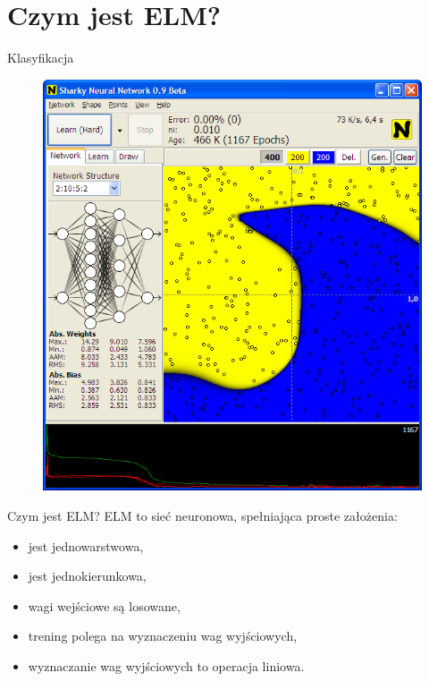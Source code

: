 \documentclass{beamer}
\begin{document}
\section{Czym jest ELM?}
\begin{frame}{Klasyfikacja}
\begin{figure}
	\includegraphics[scale=0.3]{klasyfikacja.png}
\end{figure}
\end{frame}
\begin{frame}{Czym jest ELM?}
ELM to sieć neuronowa, spełniająca proste założenia:
\begin{itemize}
\item jest jednowarstwowa,
\item jest jednokierunkowa,
\item wagi wejściowe są losowane,
\item trening polega na wyznaczeniu wag wyjściowych,
\item wyznaczanie wag wyjściowych to operacja liniowa.
\end{itemize}
\end{frame}
\end{document}
